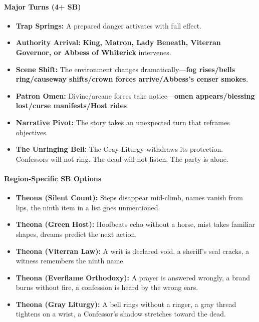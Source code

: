 \paragraph{Major Turns (4+ SB)}
\begin{itemize}
\item \textbf{Trap Springs:} A prepared danger activates with full effect.
\item \textbf{Authority Arrival:} \textbf{King, Matron, Lady Beneath, Viterran Governor, or Abbess of Whiterick} intervenes.
\item \textbf{Scene Shift:} The environment changes dramatically---\textbf{fog rises/bells ring/causeway shifts/crown forces arrive/Abbess's censer smokes}.
\item \textbf{Patron Omen:} Divine/arcane forces take notice---\textbf{omen appears/blessing lost/curse manifests/Host rides}.
\item \textbf{Narrative Pivot:} The story takes an unexpected turn that reframes objectives.
\item \textbf{The Unringing Bell:} The Gray Liturgy withdraws its protection. Confessors will not ring. The dead will not listen. The party is alone.
\end{itemize}

\paragraph{Region-Specific SB Options}
\begin{itemize}
\item \textbf{Theona (Silent Count):} Steps disappear mid-climb, names vanish from lips, the ninth item in a list goes unmentioned.
\item \textbf{Theona (Green Host):} Hoofbeats echo without a horse, mist takes familiar shapes, dreams predict the next action.
\item \textbf{Theona (Viterran Law):} A writ is declared void, a sheriff's seal cracks, a witness remembers the ninth name.
\item \textbf{Theona (Everflame Orthodoxy):} A prayer is answered wrongly, a brand burns without fire, a confession is heard by the wrong ears.
\item \textbf{Theona (Gray Liturgy):} A bell rings without a ringer, a gray thread tightens on a wrist, a Confessor's shadow stretches toward the dead.
\end{itemize}

